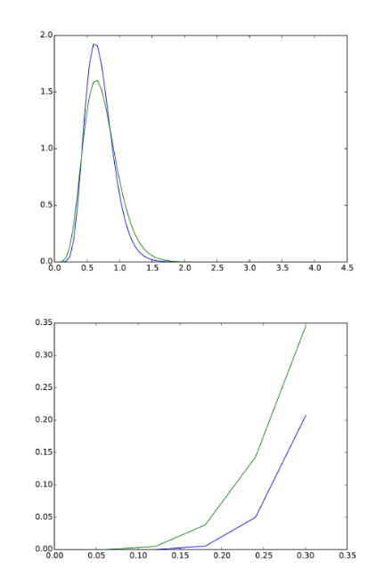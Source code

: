 \documentclass{article}
\begin{document}
\begin{figure}[htb]
	\centering
	\begin{minipage}{.45\textwidth}
		\centering
		\includegraphics[width=0.97\linewidth]{bootstrap-filter/global_complex_3_3.pdf}
	\end{minipage}
	\begin{minipage}{.45\textwidth}
		\centering
		\includegraphics[width=0.97\linewidth]{bootstrap-filter/beginning_complex_3_3.pdf}
	\end{minipage}
	\begin{minipage}{.45\textwidth}
		\centering

\end{minipage}
\end{figure}
\end{document}
